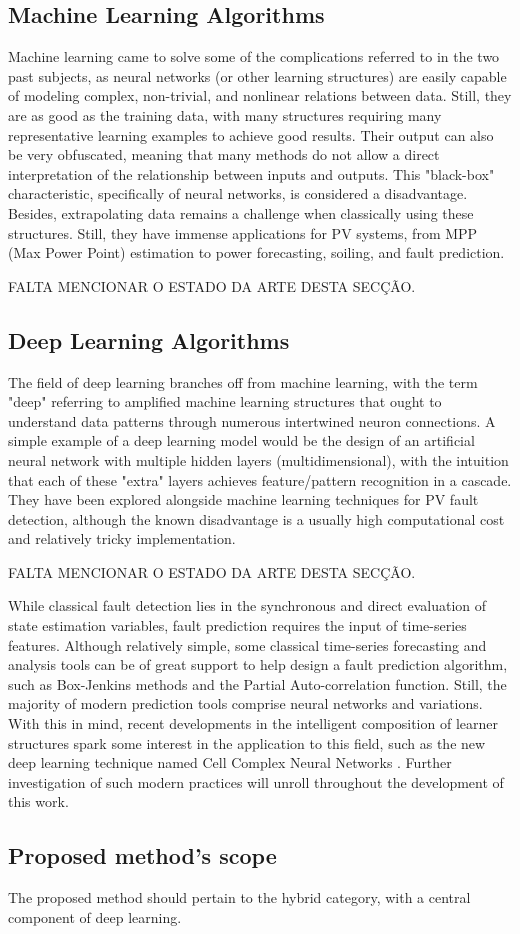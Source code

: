 \subsection{Machine Learning Algorithms} \label{subsec:machinelearning}

Machine learning came to solve some of the complications referred to in the two past subjects, as neural networks (or other learning structures) are easily capable of modeling complex, non-trivial, and nonlinear relations between data. Still, they are as good as the training data, with many structures requiring many representative learning examples to achieve good results. Their output can also be very obfuscated, meaning that many methods do not allow a direct interpretation of the relationship between inputs and outputs. This "black-box" characteristic, specifically of neural networks, is considered a disadvantage. Besides, extrapolating data remains a challenge when classically using these structures. Still, they have immense applications for PV systems, from MPP (Max Power Point) estimation to power forecasting, soiling, and fault prediction.

FALTA MENCIONAR O ESTADO DA ARTE DESTA SECÇÃO.

\subsection{Deep Learning Algorithms}

The field of deep learning branches off from machine learning, with the term "deep" referring to amplified machine learning structures that ought to understand data patterns through numerous intertwined neuron connections. A simple example of a deep learning model would be the design of an artificial neural network with multiple hidden layers (multidimensional), with the intuition that each of these "extra" layers achieves feature/pattern recognition in a cascade. They have been explored alongside machine learning techniques for PV fault detection, although the known disadvantage is a usually high computational cost and relatively tricky implementation.

FALTA MENCIONAR O ESTADO DA ARTE DESTA SECÇÃO.

While classical fault detection lies in the synchronous and direct evaluation of state estimation variables, fault prediction requires the input of time-series features. Although relatively simple, some classical time-series forecasting and analysis tools can be of great support to help design a fault prediction algorithm, such as Box-Jenkins methods and the Partial Auto-correlation function. Still, the majority of modern prediction tools comprise neural networks and variations. With this in mind, recent developments in the intelligent composition of learner structures spark some interest in the application to this field, such as the new deep learning technique named Cell Complex Neural Networks \cite{Hajij2020}. Further investigation of such modern practices will unroll throughout the development of this work.


\subsection{Proposed method's scope}

The proposed method should pertain to the hybrid category, with a central component of deep learning.